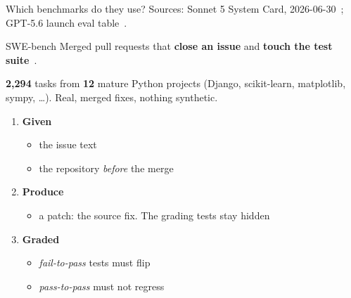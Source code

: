 \documentclass[
  aspectratio=169,
  font=times,
  sectionpage=true,
]{tumbeamer}
\begin{document}
\begin{frame}{Which benchmarks do they use?}
  \smallskip
  {\tiny Sources: Sonnet 5 System Card,
  2026-06-30~\cite{anthropic2026sonnet5,vellum2026sonnet5}; GPT-5.6 launch
  eval table~\cite{openai2026gpt56,aa2026codingindex}.}
\end{frame}

\begin{frame}{SWE-bench}
  \label{fr:swebench}
  Merged pull requests that \textbf{close an issue} and \textbf{touch the test
  suite}~\cite{jimenez2024swebench}.

  \smallskip
  {\small \textbf{2{,}294} tasks from \textbf{12} mature Python projects
  (Django, scikit-learn, matplotlib, sympy, \ldots). Real, merged fixes,
  nothing synthetic.}

  \bigskip
  \begin{enumerate}
    \item \textbf{Given}
      \begin{itemize}
        \item the issue text
        \item the repository \emph{before} the merge
      \end{itemize}
      \smallskip
    \item \textbf{Produce}
      \begin{itemize}
        \item a patch: the source fix. The grading tests stay hidden
      \end{itemize}
      \smallskip
    \item \textbf{Graded}
      \begin{itemize}
        \item \emph{fail-to-pass} tests must flip
        \item \emph{pass-to-pass} must not regress
      \end{itemize}
  \end{enumerate}
\end{frame}

\end{document}
